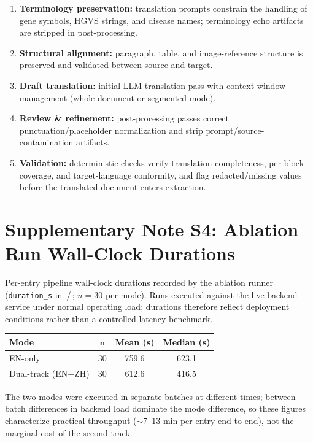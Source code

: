 \documentclass[12pt]{article}
\begin{document}
\begin{enumerate}
  \item \textbf{Terminology preservation:} translation prompts constrain
    the handling of gene symbols, HGVS strings, and disease names;
    terminology echo artifacts are stripped in post-processing.
  \item \textbf{Structural alignment:} paragraph, table, and
    image-reference structure is preserved and validated between source
    and target.
  \item \textbf{Draft translation:} initial LLM translation pass with
    context-window management (whole-document or segmented mode).
  \item \textbf{Review \& refinement:} post-processing passes correct
    punctuation/placeholder normalization and strip
    prompt/source-contamination artifacts.
  \item \textbf{Validation:} deterministic checks verify translation
    completeness, per-block coverage, and target-language conformity, and
    flag redacted/missing values before the translated document enters
    extraction.
\end{enumerate}

\section*{Supplementary Note S4: Ablation Run Wall-Clock Durations}

Per-entry pipeline wall-clock durations recorded by the ablation runner
(\texttt{duration\_s} in
\,/\,; $n = 30$
per mode). Runs executed against the live backend service under normal
operating load; durations therefore reflect deployment conditions rather
than a controlled latency benchmark.

\begin{center}
  \begin{tabular}{@{}lccc@{}}
    \toprule
    \textbf{Mode} & $\boldsymbol{n}$ & \textbf{Mean (s)} &
    \textbf{Median (s)} \\
    \midrule
    EN-only & 30 & 759.6 & 623.1 \\
    Dual-track (EN+ZH) & 30 & 612.6 & 416.5 \\
    \bottomrule
  \end{tabular}
\end{center}

The two modes were executed in separate batches at different times;
between-batch differences in backend load dominate the mode difference,
so these figures characterize practical throughput ($\sim$7--13 min per
entry end-to-end), not the marginal cost of the second track.
\end{document}
